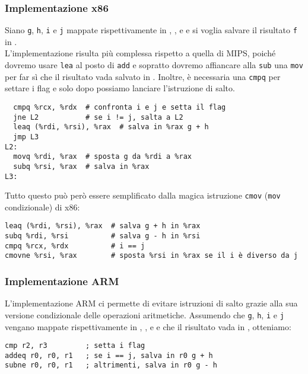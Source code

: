 \documentclass[class=book, crop=false, oneside]{standalone}
\begin{document}
\subsubsection{Implementazione x86}
Siano \texttt{g}, \texttt{h}, \texttt{i} e \texttt{j} mappate rispettivamente in , ,  e  e si voglia salvare il risultato \texttt{f} in .\\
L'implementazione risulta più complessa rispetto a quella di MIPS, poiché dovremo usare \texttt{lea} al posto di \texttt{add} e sopratto dovremo affiancare alla \texttt{sub} una \texttt{mov} per far sì che il risultato vada salvato in . Inoltre, è necessaria una \texttt{cmpq} per settare i flag e solo dopo possiamo lanciare l'istruzione di salto.
\begin{verbatim}
  cmpq %rcx, %rdx  # confronta i e j e setta il flag
  jne L2           # se i != j, salta a L2
  leaq (%rdi, %rsi), %rax  # salva in %rax g + h
  jmp L3
L2:
  movq %rdi, %rax  # sposta g da %rdi a %rax
  subq %rsi, %rax  # salva in %rax
L3:
\end{verbatim}
Tutto questo può però essere semplificato dalla magica istruzione \texttt{cmov} (\texttt{mov} condizionale) di x86:
\begin{verbatim}
leaq (%rdi, %rsi), %rax  # salva g + h in %rax
subq %rdi, %rsi          # salva g - h in %rsi
cmpq %rcx, %rdx          # i == j
cmovne %rsi, %rax        # sposta %rsi in %rax se il i è diverso da j
\end{verbatim}

\subsubsection{Implementazione ARM}
L'implementazione ARM ci permette di evitare istruzioni di salto grazie alla sua versione condizionale delle operazioni aritmetiche. Assumendo che \texttt{g}, \texttt{h}, \texttt{i} e \texttt{j} vengano mappate rispettivamente in , ,  e  e che il risultato vada in , otteniamo:
\begin{verbatim}
cmp r2, r3         ; setta i flag
addeq r0, r0, r1   ; se i == j, salva in r0 g + h
subne r0, r0, r1   ; altrimenti, salva in r0 g - h
\end{verbatim}
\end{document}
